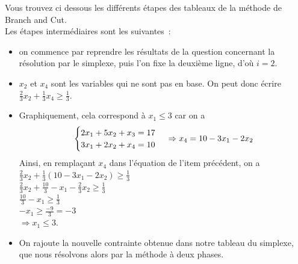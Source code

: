 Vous trouvez ci dessous les différents étapes des tableaux de la
méthode de Branch and Cut. \\
Les étapes intermédiaires sont les suivantes~:
\begin{itemize}
\item on commence par reprendre les résultats de la question
  concernant la résolution par le simplexe, puis l'on fixe la deuxième
  ligne, d'où $i = 2$.
\item $x_2$ et $x_4$ sont les variables qui ne sont pas en base. On
  peut donc écrire $\frac{2}{3} x_2 + \frac{1}{3} x_4 \geq
  \frac{1}{3}$.
\item Graphiquement, cela correspond à $x_1 \leq 3$ car on a 
\begin{equation}
\begin{cases}
2x_1 + 5x_2 + x_3  = 17 \\
3x_1 + 2x_2 + x_4  = 10 \\
\end{cases}
\\
\Rightarrow x_4  = 10 - 3x_1 - 2x_2 
\end{equation}
Ainsi, en remplaçant $x_4$ dans l'équation de l'item précédent, on a
\\
$\frac{2}{3}x_2 + \frac{1}{3}(10-3x_1-2x_2) \geq \frac{1}{3}$ \\
$\frac{2}{3}x_2 + \frac{10}{3} - x_1 - \frac{2}{3}x_2 \geq
\frac{1}{3}$ \\
$\frac{10}{3} - x_1 \geq \frac{1}{3}$ \\
$-x_1 \geq \frac{-9}{3} = -3$ \\
$\Rightarrow x_1 \leq 3$.
\item On rajoute la nouvelle contrainte obtenue dans notre tableau du
  simplexe, que nous résolvons alors par la méthode à deux phases.
\end{itemize}

